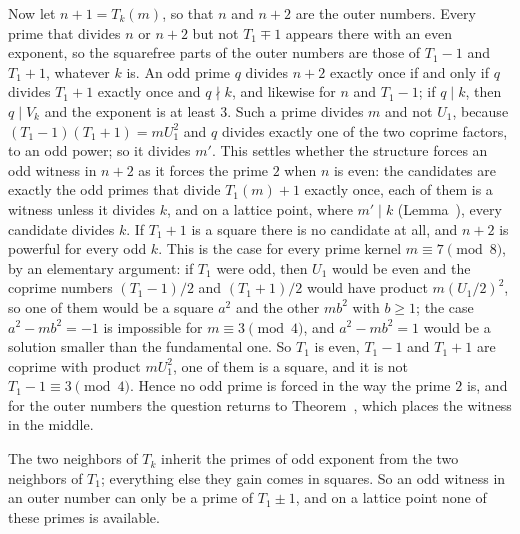 \begin{remark}
Now let $n + 1 = T_k(m)$, so that $n$ and $n + 2$ are the outer numbers. Every prime that divides $n$ or $n + 2$ but not $T_1 \mp 1$ appears
there with an even exponent, so the squarefree parts of the outer numbers are those of $T_1 - 1$ and $T_1 + 1$, whatever $k$ is. An odd prime $q$
divides $n + 2$ exactly once if and only if $q$ divides $T_1 + 1$ exactly once and $q \nmid k$, and likewise for $n$ and $T_1 - 1$; if $q \mid k$,
then $q \mid V_k$ and the exponent is at least $3$. Such a prime divides $m$ and not $U_1$, because $(T_1 - 1)(T_1 + 1) = m U_1^2$ and $q$ divides
exactly one of the two coprime factors, to an odd power; so it divides $m'$. This settles whether the structure forces an odd witness in
$n + 2$ as it forces the prime $2$ when $n$ is even: the candidates are exactly the odd primes that divide $T_1(m) + 1$ exactly once, each of
them is a witness unless it divides $k$, and on a lattice point, where $m' \mid k$ (Lemma~), every candidate divides $k$. If
$T_1 + 1$ is a square there is no candidate at all, and $n + 2$ is powerful for every odd $k$. This is the case for every prime kernel
$m \equiv 7 \pmod 8$, by an elementary argument: if $T_1$ were odd, then $U_1$ would be even and the coprime numbers $(T_1 - 1)/2$ and $(T_1 + 1)/2$
would have product $m (U_1/2)^2$, so one of them would be a square $a^2$ and the other $m b^2$ with $b \ge 1$; the case $a^2 - m b^2 = -1$ is
impossible for $m \equiv 3 \pmod 4$, and $a^2 - m b^2 = 1$ would be a solution smaller than the fundamental one. So $T_1$ is even, $T_1 - 1$ and
$T_1 + 1$ are coprime with product $m U_1^2$, one of them is a square, and it is not $T_1 - 1 \equiv 3 \pmod 4$. Hence no odd prime is forced
in the way the prime $2$ is, and for the outer numbers the question returns to Theorem~, which places the witness in the middle.
\end{remark}

\inwords The two neighbors of $T_k$ inherit the primes of odd exponent from the two neighbors of $T_1$; everything else they gain comes in squares. So an odd witness in an outer number can only be a prime of $T_1 \pm 1$, and on a lattice point none of these primes is available.

